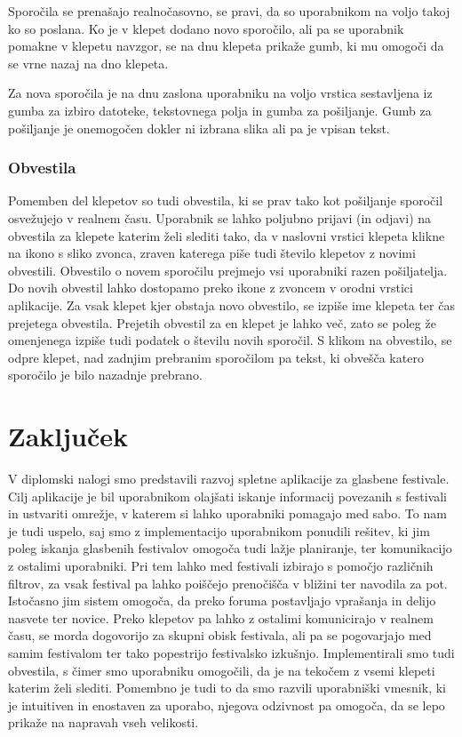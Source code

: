 \documentclass[a4paper,12pt,openright]{book}
\begin{document}
Sporočila se prenašajo realnočasovno, se pravi, da so uporabnikom na voljo takoj ko so poslana.
Ko je v klepet dodano novo sporočilo, ali pa se uporabnik pomakne v klepetu navzgor, se na dnu klepeta prikaže gumb, ki mu omogoči da se vrne nazaj na dno klepeta.

Za nova sporočila je na dnu zaslona uporabniku na voljo vrstica sestavljena iz gumba za izbiro datoteke, tekstovnega polja in gumba za pošiljanje.
Gumb za pošiljanje je onemogočen dokler ni izbrana slika ali pa je vpisan tekst.


\subsection{Obvestila}
Pomemben del klepetov so tudi obvestila, ki se prav tako kot pošiljanje sporočil osvežujejo v realnem času.
Uporabnik se lahko poljubno prijavi (in odjavi) na obvestila za klepete katerim želi slediti tako, da v naslovni vrstici klepeta klikne na ikono s sliko zvonca, zraven katerega piše tudi število klepetov z novimi obvestili.
Obvestilo o novem sporočilu prejmejo vsi uporabniki razen pošiljatelja.
Do novih obvestil lahko dostopamo preko ikone z zvoncem v orodni vrstici aplikacije.
Za vsak klepet kjer obstaja novo obvestilo, se izpiše ime klepeta ter čas prejetega obvestila. 
Prejetih obvestil za en klepet je lahko več, zato se poleg že omenjenega izpiše tudi podatek o številu novih sporočil.
S klikom na obvestilo, se odpre klepet, nad zadnjim prebranim sporočilom pa tekst, ki obvešča katero sporočilo je bilo nazadnje prebrano.

\chapter{Zaključek}
V diplomski nalogi smo predstavili razvoj spletne aplikacije za glasbene festivale.
Cilj aplikacije je bil uporabnikom olajšati iskanje informacij povezanih s festivali in ustvariti omrežje, v katerem si lahko uporabniki pomagajo med sabo.
To nam je tudi uspelo, saj smo z implementacijo uporabnikom ponudili rešitev, ki jim poleg iskanja glasbenih festivalov omogoča tudi lažje planiranje, ter komunikacijo z ostalimi uporabniki.
Pri tem lahko med festivali izbirajo s pomočjo različnih filtrov, za vsak festival pa lahko poiščejo prenočišča v bližini ter navodila za pot.
Istočasno jim sistem omogoča, da preko foruma postavljajo vprašanja in delijo nasvete ter novice.
Preko klepetov pa lahko z ostalimi komunicirajo v realnem času, se morda dogovorijo za skupni obisk festivala, ali pa se pogovarjajo med samim festivalom ter tako popestrijo festivalsko izkušnjo.
Implementirali smo tudi obvestila, s čimer smo uporabniku omogočili, da je na tekočem z vsemi klepeti katerim želi slediti.
Pomembno je tudi to da smo razvili uporabniški vmesnik, ki je intuitiven in enostaven za uporabo, njegova odzivnost pa omogoča, da se lepo prikaže na napravah vseh velikosti.
\end{document}
